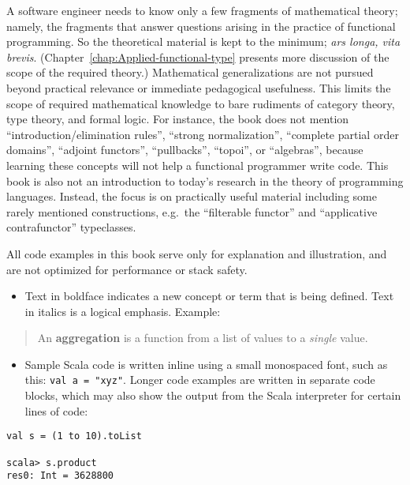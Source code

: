 A software engineer needs to know only a few fragments of mathematical
theory; namely, the fragments that answer questions arising in the
practice of functional programming. So the theoretical material is
kept to the minimum; \emph{ars longa, vita brevis}. (Chapter~\ref{chap:Applied-functional-type}
presents more discussion of the scope of the required theory.) Mathematical
generalizations are not pursued beyond practical relevance or immediate
pedagogical usefulness. This limits the scope of required mathematical
knowledge to bare rudiments of category theory, type theory, and formal
logic. For instance, the book does not mention ``introduction/elimination
rules'', ``strong normalization'', ``complete partial order domains'',
``adjoint functors'', ``pullbacks'', ``topoi'', or ``algebras'',
because learning these concepts will not help a functional programmer
write code. This book is also not an introduction to today's research
in the theory of programming languages. Instead, the focus is on practically
useful material \textendash{} including some rarely mentioned constructions,
e.g.~the ``filterable functor'' and ``applicative contrafunctor''
typeclasses. 

All code examples in this book serve only for explanation and illustration,
and are not optimized for performance or stack safety.

\begin{itemize}
\item Text in boldface indicates a new concept or term that is being defined.
Text in italics is a logical emphasis. Example:
\end{itemize}
\begin{quotation}
An \textbf{aggregation} is a function from a list
of values to a \emph{single} value.
\end{quotation}
\begin{itemize}
\item Sample Scala code is written inline using a small monospaced font,
such as this: \lstinline!val a = "xyz"!. Longer code examples are
written in separate code blocks, which may also show the output from
the Scala interpreter for certain lines of code:
\end{itemize}
\begin{lstlisting}
val s = (1 to 10).toList

scala> s.product
res0: Int = 3628800 
\end{lstlisting}

